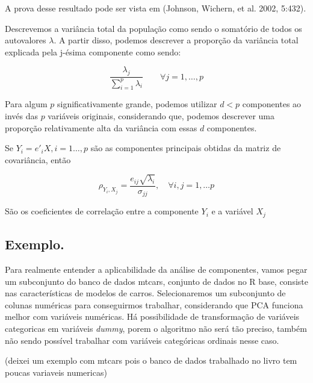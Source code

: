 \documentclass[
  letterpaper,
  DIV=11,
  numbers=noendperiod]{scrreprt}
\begin{document}
A prova desse resultado pode ser vista em (Johnson, Wichern, et al.
2002, 5:432).

Descrevemos a variância total da população como sendo o somatório de
todos os autovalores \(\lambda\). A partir disso, podemos descrever a
proporção da variância total explicada pela j-ésima componente como
sendo:

\[
\frac{\lambda_j}{\sum_{i=1}^p \lambda_i} \qquad \forall j =1,\dots,p
\]

Para algum \(p\) significativamente grande, podemos utilizar \(d<p\)
componentes ao invés das \(p\) variáveis originais, considerando que,
podemos descrever uma proporção relativamente alta da variância com
essas \(d\) componentes.

Se \(Y_i = e'_iX, i =1\dots,p\) são as componentes principais obtidas da
matriz de covariância, então

\[
\rho_{Y_i,X_j} = \frac{e_{ij}\sqrt{\lambda_i}}{\sigma_{jj}}, \quad \forall i,j=1,\dots p 
\]

São os coeficientes de correlação entre a componente \(Y_i\) e a
variável \(X_j\)

\hypertarget{exemplo.}{%
\subsection{Exemplo.}\label{exemplo.}}

Para realmente entender a aplicabilidade da análise de componentes,
vamos pegar um subconjunto do banco de dados mtcars, conjunto de dados
no R base, consiste nas características de modelos de carros.
Selecionaremos um subconjunto de colunas numéricas para conseguirmos
trabalhar, considerando que PCA funciona melhor com variáveis numéricas.
Há possibilidade de transformação de variáveis categoricas em variáveis
\emph{dummy}, porem o algoritmo não será tão preciso, também não sendo
possível trabalhar com variáveis categóricas ordinais nesse caso.

(deixei um exemplo com mtcars pois o banco de dados trabalhado no livro
tem poucas variaveis numericas)
\end{document}
